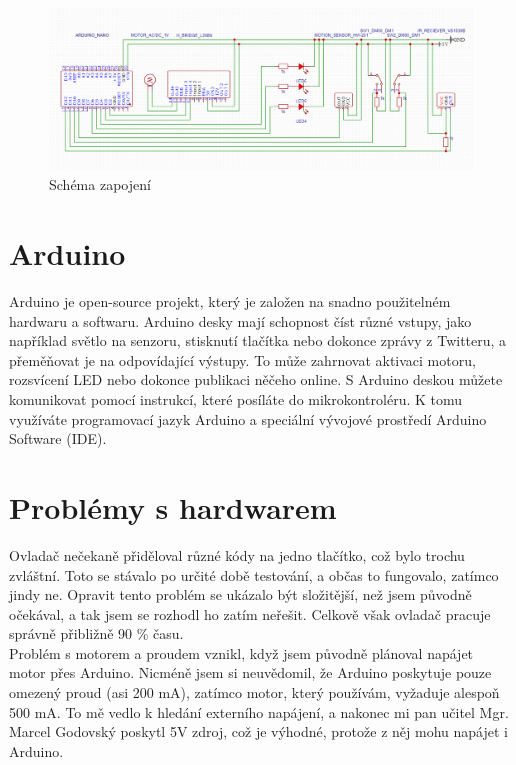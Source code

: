 \documentclass[12pt, a4paper, twoside]{report}
\begin{document}
	\begin{figure}[h]
		\centering
		\includegraphics[width=1\linewidth]{image/schema.png}
		\caption{Schéma zapojení}
		\label{fig:schemaobr} 
	\end{figure}
	
	\section{Arduino}
	
	\noindent Arduino je open-source projekt, který je založen na snadno použitelném hardwaru a softwaru. Arduino desky mají schopnost číst různé vstupy, jako například světlo na senzoru, stisknutí tlačítka nebo dokonce zprávy z Twitteru, a přeměňovat je na odpovídající výstupy. To může zahrnovat aktivaci motoru, rozsvícení LED nebo dokonce publikaci něčeho online. S Arduino deskou můžete komunikovat pomocí instrukcí, které posíláte do mikrokontroléru. K tomu využíváte programovací jazyk Arduino a speciální vývojové prostředí Arduino Software (IDE). \\
	
	\section{Problémy s hardwarem}
	\noindent 
	Ovladač nečekaně přiděloval různé kódy na jedno tlačítko, což bylo trochu zvláštní. Toto se stávalo po určité době testování, a občas to fungovalo, zatímco jindy ne. Opravit tento problém se ukázalo být složitější, než jsem původně očekával, a tak jsem se rozhodl ho zatím neřešit. Celkově však ovladač pracuje správně přibližně 90 \% času. \\
	
	\noindent Problém s motorem a proudem vznikl, když jsem původně plánoval napájet motor přes Arduino. Nicméně jsem si neuvědomil, že Arduino poskytuje pouze omezený proud (asi 200 mA), zatímco motor, který používám, vyžaduje alespoň 500 mA. To mě vedlo k hledání externího napájení, a nakonec mi pan učitel Mgr. Marcel Godovský poskytl 5V zdroj, což je výhodné, protože z něj mohu napájet i Arduino. \\
	 
\end{document}
